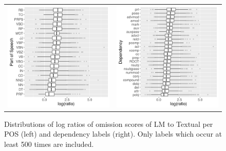 \begin{figure}[t]
  \centering
  \hspace*{-0.2in}
  \setlength{\tabcolsep}{0pt}
  \begin{tabular}{cc}
  \includegraphics[scale=0.55]{imaginet-omission-quotient-pos-boxplot.png} &
  \includegraphics[scale=0.55]{imaginet-omission-quotient-dep-boxplot.png} \\  
  \end{tabular}
  \caption{Distributions of log ratios of omission scores of {\sc LM} to {\sc Textual} per
    POS (left) and dependency labels (right). Only labels which occur at least 500 times are included.}
\label{fig:omission-imaginet-quotient}
\end{figure}


